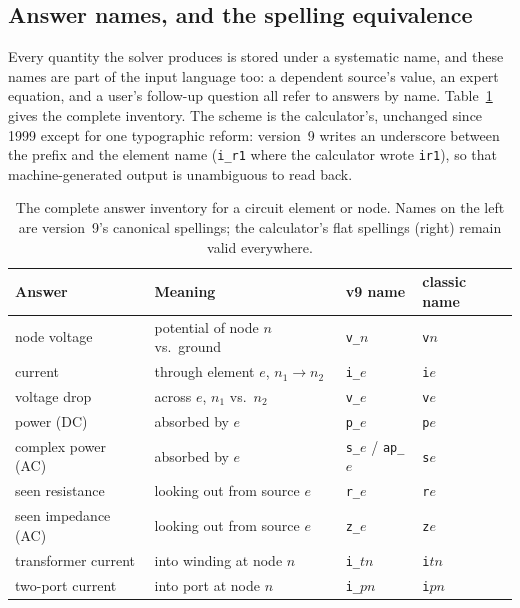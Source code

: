 \documentclass[11pt,oneside]{report}
\newcommand{\code}[1]{\texttt{#1}}
\begin{document}
\subsection{Answer names, and the spelling equivalence}
\label{sec:names}

Every quantity the solver produces is stored under a systematic name,
and these names are part of the input language too: a dependent
source's value, an expert equation, and a user's follow-up question
all refer to answers by name. Table~\ref{tab:names} gives the
complete inventory. The scheme is the calculator's, unchanged since
1999 except for one typographic reform: version~9 writes an
underscore between the prefix and the element name (\code{i\_r1}
where the calculator wrote \code{ir1}), so that machine-generated
output is unambiguous to read back.

\begin{table}[htbp]
\caption{The complete answer inventory for a circuit element or node.
Names on the left are version~9's canonical spellings; the
calculator's flat spellings (right) remain valid everywhere.}
\label{tab:names}
\centering
\begin{tabular}{@{}llll@{}}
\toprule
Answer & Meaning & v9 name & classic name \\
\midrule
node voltage & potential of node $n$ vs.\ ground & \code{v\_$n$} & \code{v$n$} \\
current & through element $e$, $n_1 \to n_2$ & \code{i\_$e$} & \code{i$e$} \\
voltage drop & across $e$, $n_1$ vs.\ $n_2$ & \code{v\_$e$} & \code{v$e$} \\
power (DC) & absorbed by $e$ & \code{p\_$e$} & \code{p$e$} \\
complex power (AC) & absorbed by $e$ & \code{s\_$e$} / \code{ap\_$e$} & \code{s$e$} \\
seen resistance & looking out from source $e$ & \code{r\_$e$} & \code{r$e$} \\
seen impedance (AC) & looking out from source $e$ & \code{z\_$e$} & \code{z$e$} \\
transformer current & into winding at node $n$ & \code{i\_$t$$n$} & \code{i$t$$n$} \\
two-port current & into port at node $n$ & \code{i\_$p$$n$} & \code{i$p$$n$} \\
\bottomrule
\end{tabular}
\end{table}
\end{document}
